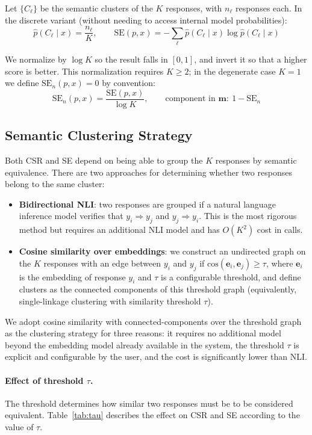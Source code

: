 \documentclass[11pt,a4paper]{article}
\begin{document}
Let $\{C_\ell\}$ be the semantic clusters of the $K$ responses, with $n_\ell$ responses each. In the discrete variant (without needing to access internal model probabilities):
\[
\hat{p}(C_\ell \mid x) = \frac{n_\ell}{K}, \qquad
\mathrm{SE}(p, x) = -\sum_{\ell} \hat{p}(C_\ell \mid x) \log \hat{p}(C_\ell \mid x)
\]

We normalize by $\log K$ so the result falls in $[0, 1]$, and invert it so that a higher score is better. This normalization requires $K \geq 2$; in the degenerate case $K = 1$ we define $\mathrm{SE}_n(p, x) = 0$ by convention:
\[
\mathrm{SE}_n(p, x) = \frac{\mathrm{SE}(p, x)}{\log K}, \qquad \text{component in } \mathbf{m}: \ 1 - \mathrm{SE}_n
\]

\subsection{Semantic Clustering Strategy}
\label{sec:clustering}

Both CSR and SE depend on being able to group the $K$ responses by semantic equivalence. There are two approaches for determining whether two responses belong to the same cluster:

\begin{itemize}[noitemsep]
    \item \textbf{Bidirectional NLI}: two responses are grouped if a natural language inference model verifies that $y_i \Rightarrow y_j$ and $y_j \Rightarrow y_i$. This is the most rigorous method but requires an additional NLI model and has $O(K^2)$ cost in calls.
    \item \textbf{Cosine similarity over embeddings}: we construct an undirected graph on the $K$ responses with an edge between $y_i$ and $y_j$ if $\mathrm{cos}(\mathbf{e}_i, \mathbf{e}_j) \geq \tau$, where $\mathbf{e}_i$ is the embedding of response $y_i$ and $\tau$ is a configurable threshold, and define clusters as the connected components of this threshold graph (equivalently, single-linkage clustering with similarity threshold $\tau$).
\end{itemize}

We adopt cosine similarity with connected-components over the threshold graph as the clustering strategy for three reasons: it requires no additional model beyond the embedding model already available in the system, the threshold $\tau$ is explicit and configurable by the user, and the cost is significantly lower than NLI.

\paragraph{Effect of threshold $\tau$.}
The threshold determines how similar two responses must be to be considered equivalent. Table~\ref{tab:tau} describes the effect on CSR and SE according to the value of $\tau$.
\end{document}
